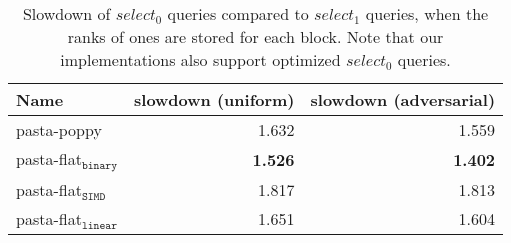 \documentclass[a4paper,UKenglish,cleveref, autoref, thm-restate]{lipics-v2021}
\begin{document}
\begin{table}
  \centering
  \begin{tabular}{lrr}
    \toprule
    Name &  slowdown (uniform) & slowdown (adversarial)\\
    \midrule
    pasta-poppy & 1.632 & 1.559 \\
    pasta-flat\(_{\texttt{binary}}\) & \textbf{1.526} & \textbf{1.402} \\
    pasta-flat\(_{\texttt{SIMD}}\)  & 1.817 & 1.813 \\
    pasta-flat\(_{\texttt{linear}}\) & 1.651 & 1.604 \\
    \bottomrule
  \end{tabular}
  \caption{Slowdown of \(select_0\) queries compared to \(select_1\) queries, when the ranks of ones are stored for each block. Note that our implementations also support optimized \(select_0\) queries.}
  \label{tab:slowdown_select01}
\end{table}
\end{document}
